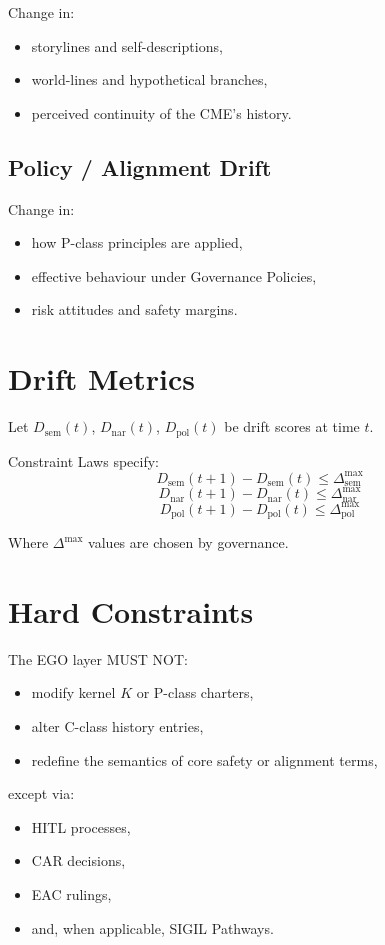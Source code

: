 Change in:
\begin{itemize}
    \item storylines and self-descriptions,
    \item world-lines and hypothetical branches,
    \item perceived continuity of the CME’s history.
\end{itemize}

\subsection{Policy / Alignment Drift}

Change in:
\begin{itemize}
    \item how P-class principles are applied,
    \item effective behaviour under Governance Policies,
    \item risk attitudes and safety margins.
\end{itemize}

\section{Drift Metrics}

Let $D_{\mathrm{sem}}(t)$, $D_{\mathrm{nar}}(t)$, $D_{\mathrm{pol}}(t)$ be
drift scores at time $t$.

Constraint Laws specify:
\[
D_{\mathrm{sem}}(t+1) - D_{\mathrm{sem}}(t) \le \Delta_{\mathrm{sem}}^{\max}
\]
\[
D_{\mathrm{nar}}(t+1) - D_{\mathrm{nar}}(t) \le \Delta_{\mathrm{nar}}^{\max}
\]
\[
D_{\mathrm{pol}}(t+1) - D_{\mathrm{pol}}(t) \le \Delta_{\mathrm{pol}}^{\max}
\]

Where $\Delta^{\max}$ values are chosen by governance.

\section{Hard Constraints}

The EGO layer MUST NOT:

\begin{itemize}
    \item modify kernel $K$ or P-class charters,
    \item alter C-class history entries,
    \item redefine the semantics of core safety or alignment terms,
\end{itemize}
except via:
\begin{itemize}
    \item HITL processes,
    \item CAR decisions,
    \item EAC rulings,
    \item and, when applicable, SIGIL Pathways.
\end{itemize}


